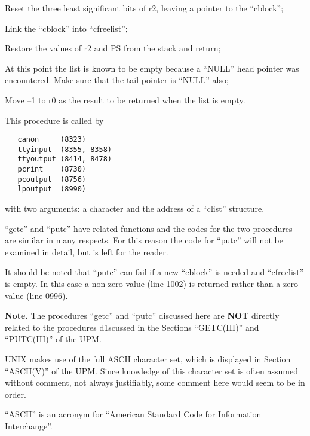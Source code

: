 \item[0953:] Reset the three least significant
bits of r2, leaving a pointer to
the ``cblock'';

\item[0954:] Link the ``cblock'' into ``cfreelist'';

\item[0957:] Restore the values of r2 and PS
from the stack and return;

\item[0961:] At this point the list is known
to be empty because a ``NULL'' head
pointer was encountered. Make
sure that the tail pointer is
``NULL'' also;

\item[0962:] Move --1 to r0 as the result to be
returned when the list is empty.
\ed


This procedure is called by

\begin{verbatim}
   canon     (8323)
   ttyinput  (8355, 8358)
   ttyoutput (8414, 8478)
   pcrint    (8730)
   pcoutput  (8756)
   lpoutput  (8990)
\end{verbatim}

\noindent with two arguments: a character and the
address of a ``clist'' structure.

``getc'' and ``putc'' have related functions and
the codes for the two procedures are similar in many respects.
For this reason the code for ``putc''
will not be examined in detail, but is
left for the reader.

It should be noted that ``putc'' can fail
if a new ``cblock'' is needed and
``cfreelist'' is empty. In this case a
non-zero value (line 1002) is returned
rather than a zero value (line 0996).

{\bf Note.} The procedures ``getc'' and ``putc''
discussed here are {\bf NOT} directly related
to the procedures d1scussed in the Sections
``GETC(III)'' and ``PUTC(III)'' of the UPM.


UNIX makes use of the full ASCII character set,
which is displayed in Section ``ASCII(V)'' of the UPM. Since
knowledge of this character set is
often assumed without comment, not
always justifiably, some comment here
would seem to be in order.

``ASCII'' is an acronym for ``American
Standard Code for Information Interchange''.



